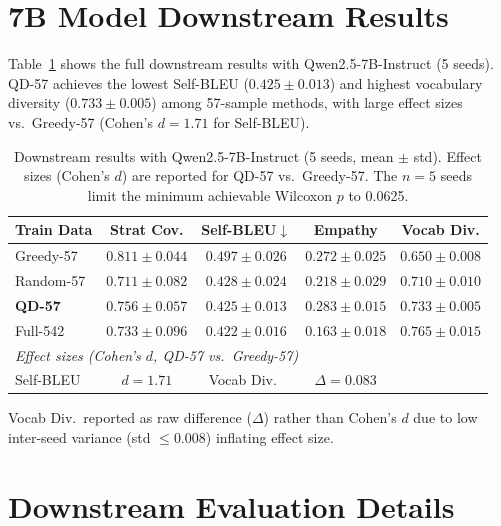 \documentclass{article}
\begin{document}
\begin{enumerate}[nosep]
\section{7B Model Downstream Results}
\label{sec:app_7b}

Table~\ref{tab:downstream_7b} shows the full downstream results with Qwen2.5-7B-Instruct (5 seeds).
QD-57 achieves the lowest Self-BLEU ($0.425 \pm 0.013$) and highest vocabulary diversity ($0.733 \pm 0.005$) among 57-sample methods, with large effect sizes vs.\ Greedy-57 (Cohen's $d{=}1.71$ for Self-BLEU).

\begin{table}[h]
\centering
\caption{Downstream results with Qwen2.5-7B-Instruct (5 seeds, mean $\pm$ std). Effect sizes (Cohen's $d$) are reported for QD-57 vs.\ Greedy-57. The $n{=}5$ seeds limit the minimum achievable Wilcoxon $p$ to 0.0625.}
\label{tab:downstream_7b}
\begin{tabular}{lcccc}
\toprule
\textbf{Train Data} & \textbf{Strat Cov.} & \textbf{Self-BLEU}$\downarrow$ & \textbf{Empathy} & \textbf{Vocab Div.} \\
\midrule
Greedy-57 & $0.811 \pm 0.044$ & $0.497 \pm 0.026$ & $0.272 \pm 0.025$ & $0.650 \pm 0.008$ \\
Random-57 & $0.711 \pm 0.082$ & $0.428 \pm 0.024$ & $0.218 \pm 0.029$ & $0.710 \pm 0.010$ \\
\textbf{QD-57} & $0.756 \pm 0.057$ & $\mathbf{0.425 \pm 0.013}$ & $\mathbf{0.283 \pm 0.015}$ & $\mathbf{0.733 \pm 0.005}$ \\
Full-542 & $0.733 \pm 0.096$ & $0.422 \pm 0.016$ & $0.163 \pm 0.018$ & $0.765 \pm 0.015$ \\
\midrule
\multicolumn{5}{l}{\textit{Effect sizes (Cohen's $d$, QD-57 vs.\ Greedy-57)}} \\
Self-BLEU & $d{=}1.71$ & Vocab Div.\ & $\Delta{=}0.083$ & \\
\bottomrule
\end{tabular}
\vspace{1mm}
{\small Vocab Div.\ reported as raw difference ($\Delta$) rather than Cohen's $d$ due to low inter-seed variance (std ${\leq}0.008$) inflating effect size.}
\end{table}

\section{Downstream Evaluation Details}
\label{sec:app_downstream}


\end{enumerate}
\end{document}
